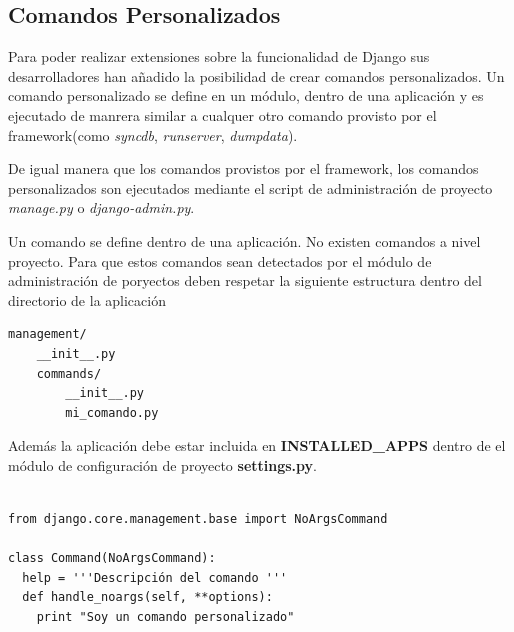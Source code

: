 \documentclass[a4paper]{report}
\begin{document}
\subsection{Comandos Personalizados}



Para poder realizar extensiones sobre la funcionalidad de Django sus
desarrolladores han añadido la posibilidad de crear comandos
personalizados. Un comando personalizado se define en un módulo, dentro
de una aplicación y es ejecutado de manrera similar a cualquer 
otro comando provisto por el framework(como 
\emph{syncdb}, \emph{runserver}, \emph{dumpdata}).

De igual manera que los comandos provistos por el framework, los comandos
personalizados son ejecutados mediante el script de administración
de proyecto \emph{manage.py} o \emph{django-admin.py}.

Un comando se define dentro de una aplicación. No existen comandos a nivel
proyecto. Para que estos comandos sean detectados por el módulo de
administración de poryectos deben  respetar la siguiente estructura dentro del
directorio de la aplicación 
\begin{verbatim}
management/
    __init__.py
    commands/
        __init__.py
        mi_comando.py
\end{verbatim}

Además la aplicación debe estar incluida en \textbf{INSTALLED\_APPS}
dentro de el módulo de configuración de proyecto \textbf{settings.py}.

\begin{lstlisting}[style=python,
		   label=basic-django-command,
		   caption=Comando personalizado básico en Django]

from django.core.management.base import NoArgsCommand

class Command(NoArgsCommand):
  help = '''Descripción del comando '''
  def handle_noargs(self, **options):
    print "Soy un comando personalizado"

\end{lstlisting}
\end{document}
